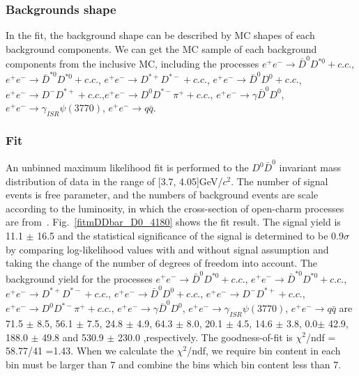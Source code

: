 \documentclass[aps,preprint,tightenlines,superscriptaddress,showpacs,byrevtex,amsmath,amssymb,nofloatfix]{revtex4}
\begin{document}
\subsubsection{Backgrounds shape}

In the fit, the background shape can be described by MC shapes of each background components. We can get the MC sample of each background components from the inclusive MC, including the processes $e^{+}e^{-}\rightarrow \bar{D}^{0}D^{*0}+c.c.$, $e^{+}e^{-}\rightarrow \bar{D}^{*0}D^{*0}+c.c.$, $e^{+}e^{-}\rightarrow D^{*+}D^{*-}+c.c.$, $e^{+}e^{-}\rightarrow \bar{D}^{0}D^{0}+c.c.$, $e^{+}e^{-}\rightarrow D^{-}D^{*+}+c.c.$,$e^{+}e^{-}\rightarrow D^{0}D^{*-}\pi^{+}+c.c.$, $e^{+}e^{-}\rightarrow \gamma \bar{D}^{0}D^{0}$, $e^{+}e^{-}\rightarrow \gamma_{ISR} \psi(3770)$, $e^{+}e^{-}\rightarrow q\bar{q}$.

\subsubsection{Fit}
An unbinned maximum likelihood fit is performed to the $D^{0}\bar{D}^{0}$  invariant mass distribution of data in the range of [3.7, 4.05]GeV/$c^{2}$. The number of signal events is free parameter, and the numbers of background events  are scale according to the luminosity, in which the cross-section of open-charm processes are from~\cite{Opench1,Opench2,Opench3,Opench4,Opench5,Opench6}. Fig.~\ref{fitmDDbar_D0_4180} shows the fit result. The signal yield is 11.1 $\pm$ 16.5 and the statistical significance of the signal is determined to be 0.9$\sigma$ by comparing log-likelihood values with and without signal assumption and taking the change of the number of degrees of freedom into account. The background yield for the processes $e^{+}e^{-}\rightarrow \bar{D}^{0}D^{*0}+c.c.$, $e^{+}e^{-}\rightarrow \bar{D}^{*0}D^{*0}+c.c.$, $e^{+}e^{-}\rightarrow D^{*+}D^{*-}+c.c.$, $e^{+}e^{-}\rightarrow \bar{D}^{0}D^{0}+c.c.$, $e^{+}e^{-}\rightarrow D^{-}D^{*+}+c.c.$, $e^{+}e^{-}\rightarrow D^{0}D^{*-}\pi^{+}+c.c.$, $e^{+}e^{-}\rightarrow \gamma \bar{D}^{0}D^{0}$, $e^{+}e^{-}\rightarrow \gamma_{ISR} \psi(3770)$, $e^{+}e^{-}\rightarrow q\bar{q}$ are 71.5 $\pm$ 8.5, 56.1 $\pm$ 7.5, 24.8 $\pm$ 4.9, 64.3 $\pm$ 8.0, 20.1 $\pm$ 4.5, 14.6 $\pm$ 3.8, 0.0$\pm$ 42.9, 188.0 $\pm$ 49.8 and 530.9 $\pm$ 230.0 ,respectively. The goodness-of-fit is $\chi^{2}$/ndf = 58.77/41 =1.43. When we calculate the $\chi^{2}$/ndf, we require bin content in each bin must be larger than 7 and combine the bins which bin content less than 7.
\end{document}
